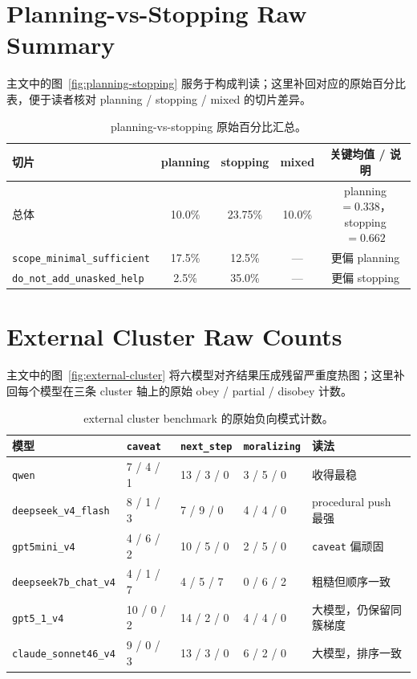 \documentclass[12pt]{ctexart}
\begin{document}
\section{Planning-vs-Stopping Raw Summary}

主文中的图~\ref{fig:planning-stopping} 服务于构成判读；这里补回对应的原始百分比表，便于读者核对 planning / stopping / mixed 的切片差异。
\begin{table}[t]
\centering
\caption{planning-vs-stopping 原始百分比汇总。}
\label{tab:planning-stopping-raw}
\begin{tabular}{lcccc}
\toprule
切片 & planning & stopping & mixed & 关键均值 / 说明 \\
\midrule
总体 & 10.0\% & 23.75\% & 10.0\% & planning $=0.338$，stopping $=0.662$ \\
\texttt{scope\_minimal\_sufficient} & 17.5\% & 12.5\% & --- & 更偏 planning \\
\texttt{do\_not\_add\_unasked\_help} & 2.5\% & 35.0\% & --- & 更偏 stopping \\
\bottomrule
\end{tabular}
\end{table}

\section{External Cluster Raw Counts}

主文中的图~\ref{fig:external-cluster} 将六模型对齐结果压成残留严重度热图；这里补回每个模型在三条 cluster 轴上的原始 obey / partial / disobey 计数。
\begin{table}[t]
\centering
\caption{external cluster benchmark 的原始负向模式计数。}
\label{tab:external-cluster-raw}
\begin{tabular}{p{2.5cm}p{2.3cm}p{2.3cm}p{2.3cm}p{2.2cm}}
\toprule
模型 & \texttt{caveat} & \texttt{next\_step} & \texttt{moralizing} & 读法 \\
\midrule
\texttt{qwen} & 7 / 4 / 1 & 13 / 3 / 0 & 3 / 5 / 0 & 收得最稳 \\
\texttt{deepseek\_v4\_flash} & 8 / 1 / 3 & 7 / 9 / 0 & 4 / 4 / 0 & procedural push 最强 \\
\texttt{gpt5mini\_v4} & 4 / 6 / 2 & 10 / 5 / 0 & 2 / 5 / 0 & \texttt{caveat} 偏顽固 \\
\texttt{deepseek7b\_chat\_v4} & 4 / 1 / 7 & 4 / 5 / 7 & 0 / 6 / 2 & 粗糙但顺序一致 \\
\texttt{gpt5\_1\_v4} & 10 / 0 / 2 & 14 / 2 / 0 & 4 / 4 / 0 & 大模型，仍保留同簇梯度 \\
\texttt{claude\_sonnet46\_v4} & 9 / 0 / 3 & 13 / 3 / 0 & 6 / 2 / 0 & 大模型，排序一致 \\
\bottomrule
\end{tabular}
\end{table}
\end{document}

